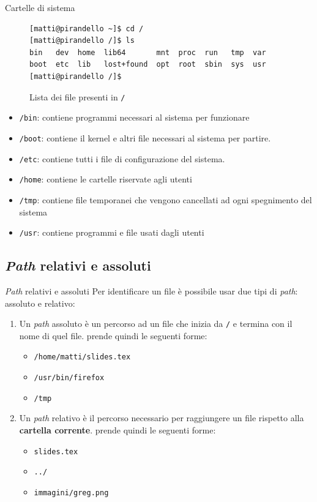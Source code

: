 \documentclass{beamer}
\begin{document}
\begin{frame}[fragile]{Cartelle di sistema}
  \begin{figure}
    \begin{lstlisting}[basicstyle=\footnotesize]
[matti@pirandello ~]$ cd /
[matti@pirandello /]$ ls
bin   dev  home  lib64       mnt  proc  run   tmp  var
boot  etc  lib   lost+found  opt  root  sbin  sys  usr
[matti@pirandello /]$
    \end{lstlisting}
    \caption{Lista dei file presenti in \texttt{/}}
  \end{figure}
  \begin{itemize}
    \item \texttt{/bin}: contiene programmi necessari al sistema per funzionare
    \item \texttt{/boot}: contiene il kernel e altri file necessari al sistema
      per partire.
    \item \texttt{/etc}: contiene tutti i file di configurazione del sistema.
    \item \texttt{/home}: contiene le cartelle riservate agli utenti
    \item \texttt{/tmp}: contiene file temporanei che vengono cancellati ad ogni
      spegnimento del sistema
    \item \texttt{/usr}: contiene programmi e file usati dagli utenti
  \end{itemize}
\end{frame}

\subsection{\textit{Path} relativi e assoluti}
\begin{frame}{\textit{Path} relativi e assoluti}
  Per identificare un file è possibile usar due tipi di \textit{path}: assoluto 
  e relativo:
  \begin{enumerate}
    \item Un \textit{path} assoluto è un percorso ad un file che inizia da 
      \texttt{/} e termina con il nome di quel file. prende quindi le seguenti
      forme:
      \begin{itemize}
        \item \texttt{/home/matti/slides.tex}
        \item \texttt{/usr/bin/firefox}
        \item \texttt{/tmp}
      \end{itemize}
    \item Un \textit{path} relativo è il percorso necessario per raggiungere un
      file rispetto alla \textbf{cartella corrente}. prende quindi le seguenti
      forme:
      \begin{itemize}
        \item \texttt{slides.tex}
        \item \texttt{../}
        \item \texttt{immagini/greg.png}
      \end{itemize}
  \end{enumerate}
\end{frame}
\end{document}
